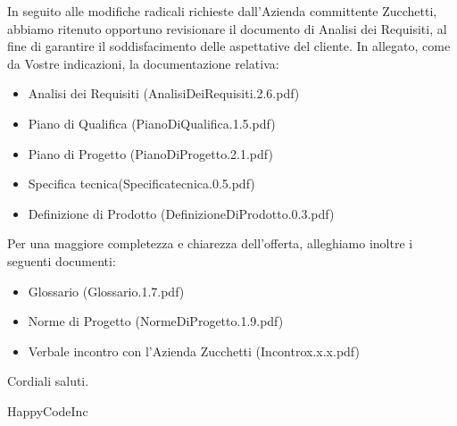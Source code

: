 \documentclass[11pt,titlepage,a4paper]{report}
\begin{document}
In seguito alle modifiche radicali richieste dall'Azienda committente Zucchetti, abbiamo ritenuto opportuno revisionare il documento di Analisi dei Requisiti, al fine di garantire il soddisfacimento delle aspettative del cliente. \newline
In allegato, come da Vostre indicazioni, la documentazione relativa:
\begin{itemize}
\item{}Analisi dei Requisiti (AnalisiDeiRequisiti.2.6.pdf)
\item{}Piano di Qualifica (PianoDiQualifica.1.5.pdf)
\item{}Piano di Progetto (PianoDiProgetto.2.1.pdf)
\item{}Specifica tecnica(Specificatecnica.0.5.pdf) 
\item{}Definizione di Prodotto (DefinizioneDiProdotto.0.3.pdf)
\end{itemize}
Per una maggiore completezza e chiarezza dell'offerta, alleghiamo inoltre i seguenti documenti:
\begin{itemize}
\item{}Glossario (Glossario.1.7.pdf)
\item{}Norme di Progetto (NormeDiProgetto.1.9.pdf)
\item{}Verbale incontro con l'Azienda Zucchetti (Incontrox.x.x.pdf)
\end{itemize}
Cordiali saluti.
\begin{flushright}
HappyCodeInc
\end{flushright}
\newpage
\end{document}
